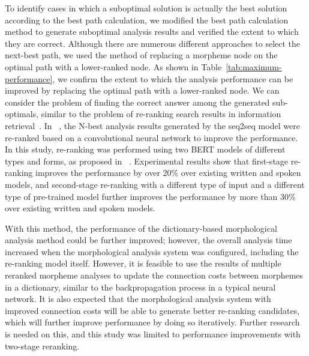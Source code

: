 \documentclass[AMS,STIX2COL]{WileyNJD-v2}
\begin{document}
    To identify cases in which a suboptimal solution is actually the best solution according to the best path calculation, we modified the best path calculation method to generate suboptimal analysis results and verified the extent to which they are correct.
    Although there are numerous different approaches to select the next-best path, we used the method of replacing a morpheme node on the optimal path with a lower-ranked node.
    As shown in Table~\ref{tab:maximum-performance}, we confirm the extent to which the analysis performance can be improved by replacing the optimal path with a lower-ranked node.
    We can consider the problem of finding the correct answer among the generated sub-optimals, similar to the problem of re-ranking search results in information retrieval~\cite{BaeYJ2021}.
    In ~\cite{ChoiYS2018}, the N-best analysis results generated by the seq2seq model were re-ranked based on a convolutional neural network to improve the performance.
    In this study, re-ranking was performed using two BERT models of different types and forms, as proposed in ~\cite{Nogueira2019}.
    Experimental results show that first-stage re-ranking improves the performance by over 20\% over existing written and spoken models, and second-stage re-ranking with a different type of input and a different type of pre-trained model further improves the performance by more than 30\% over existing written and spoken models.

    With this method, the performance of the dictionary-based morphological analysis method could be further improved; however, the overall analysis time increased when the morphological analysis system was configured, including the re-ranking model itself.
    However, it is feasible to use the results of multiple reranked morpheme analyses to update the connection costs between morphemes in a dictionary, similar to the backpropagation process in a typical neural network.
    It is also expected that the morphological analysis system with improved connection costs will be able to generate better re-ranking candidates, which will further improve performance by doing so iteratively.
    Further research is needed on this, and this study was limited to performance improvements with two-stage reranking.
\end{document}
